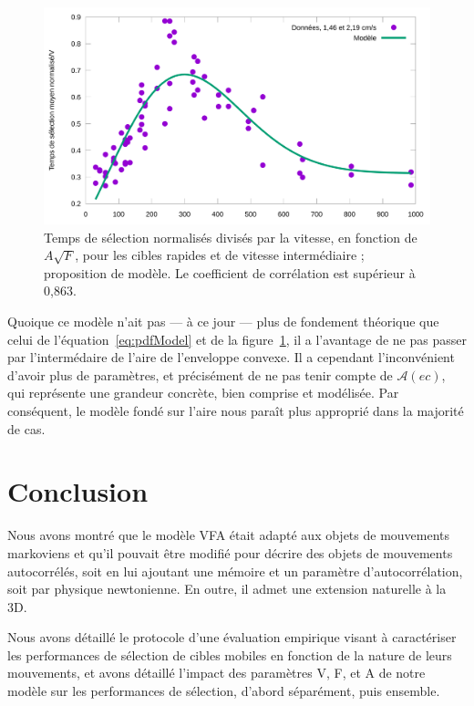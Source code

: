 	\begin{figure}[!htbp]
		\centering
		\includegraphics[width=\textwidth]{figures/ch4/timeVafFit}
		\caption[Temps de sélection/V en fonction de $A\sqrt{F}$ et modèle]{Temps de sélection normalisés divisés par la vitesse, en fonction de $A\sqrt{F}$, pour les cibles rapides et de vitesse intermédiaire ; proposition de modèle. Le coefficient de corrélation est supérieur à 0,863.}
		\label{fig:timeVafFit}
	\end{figure}
	

	
	Quoique ce modèle n'ait pas --- à ce jour --- plus de fondement théorique que celui de l'équation~\ref{eq:pdfModel} et de la figure~\ref{fig:timeVafFit}, il a l'avantage de ne pas passer par l'intermédaire de l'aire de l'enveloppe convexe. Il a cependant l'inconvénient d'avoir plus de paramètres, et précisément de ne pas tenir compte de $\mathcal{A}(ec)$, qui représente une grandeur concrète, bien comprise et modélisée. Par conséquent, le modèle fondé sur l'aire nous paraît plus approprié dans la majorité de cas.

\section{Conclusion}
	Nous avons montré que le modèle VFA était adapté aux objets de mouvements markoviens et qu'il pouvait être modifié pour décrire des objets de mouvements autocorrélés, soit en lui ajoutant une mémoire et un paramètre d'autocorrélation, soit par physique newtonienne. En outre, il admet une extension naturelle à la 3D.
	
	Nous avons détaillé le protocole d'une évaluation empirique visant à caractériser les performances de sélection de cibles mobiles en fonction de la nature de leurs mouvements, et avons détaillé l'impact des paramètres V, F, et A de notre modèle sur les performances de sélection, d'abord séparément, puis ensemble.
	
